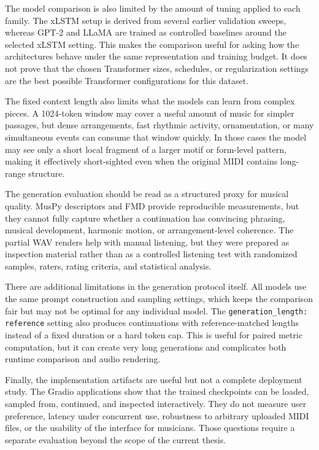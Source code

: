 The model comparison is also limited by the amount of tuning applied to each
family. The xLSTM setup is derived from several earlier validation sweeps,
whereas GPT-2 and LLaMA are trained as controlled baselines around the selected
xLSTM setting. This makes the comparison useful for asking how the architectures
behave under the same representation and training budget. It does not prove that
the chosen Transformer sizes, schedules, or regularization settings are the best
possible Transformer configurations for this dataset.

The fixed context length also limits what the models can learn from complex
pieces. A 1024-token window may cover a useful amount of music for simpler
passages, but dense arrangements, fast rhythmic activity, ornamentation, or many
simultaneous events can consume that window quickly. In those cases the model
may see only a short local fragment of a larger motif or form-level pattern,
making it effectively short-sighted even when the original MIDI contains
long-range structure.

The generation evaluation should be read as a structured proxy for musical
quality. MusPy descriptors and FMD provide reproducible measurements, but they
cannot fully capture whether a continuation has convincing phrasing, musical
development, harmonic motion, or arrangement-level coherence. The partial WAV
renders help with manual listening, but they were prepared as inspection
material rather than as a controlled listening test with randomized samples,
raters, rating criteria, and statistical analysis.

There are additional limitations in the generation protocol itself. All models
use the same prompt construction and sampling settings, which keeps the
comparison fair but may not be optimal for any individual model. The
\verb|generation_length: reference| setting also produces continuations with
reference-matched lengths instead of a fixed duration or a hard token cap. This
is useful for paired metric computation, but it can create very long generations
and complicates both runtime comparison and audio rendering.

Finally, the implementation artifacts are useful but not a complete deployment
study. The Gradio applications show that the trained checkpoints can be loaded,
sampled from, continued, and inspected interactively. They do not measure user
preference, latency under concurrent use, robustness to arbitrary uploaded MIDI
files, or the usability of the interface for musicians. Those questions require
a separate evaluation beyond the scope of the current thesis.
